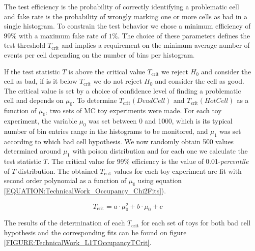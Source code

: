 The test efficiency is the probability of correctly identifying a problematic cell and fake rate is the probability of wrongly marking one or more cells as bad in a single histogram. To constrain the test behavior we chose a minimum efficiency of $99\%$ with a maximum fake rate of $1\%$. The choice of these parameters defines the test threshold $T_{\text{crit}}$ and implies a requirement on the minimum average number of events per cell depending on the number of bins per histogram.

If the test statistic $T$ is above the critical value $T_{\text{crit}}$ we reject $H_0$ and consider the cell as bad, if is it below $T_{\text{crit}}$ we do not reject $H_0$ and consider the cell as good. The critical value is set by a choice of confidence level of finding a problematic cell and depends on $\mu_0$. To determine $T_{\text{crit}}(Dead Cell)$ and $T_{\text{crit}}(Hot Cell)$ as a function of $\mu_0$, two sets of \gls{MC} toy experiments were made. For each toy experiment, the variable $\mu_0$ was set between 0 and 1000, which is its typical number of bin entries range in the histograms to be monitored, and $\mu_1$ was set according to which bad cell hypothesis. We now randomly obtain 500 values determined around $\mu_1$ with poison distribution and for each one we calculate the test statistic $T$. The critical value for 99\% efficiency is the value of 0.01-\textit{percentile} of $T$ distribution. The obtained $T_{\text{crit}}$ values for each toy experiment are fit with second order polynomial as a function of $\mu_0$ using equation \ref{EQUATION:TechnicalWork_Occupancy_Chi2Fits}).


\begin{equation}
T_{\text{crit}}=a \cdot \mu_0^2 + b \cdot \mu_0 + c
\label{EQUATION:TechnicalWork_Occupancy_Chi2Fits}
\end{equation}

The results of the determination of each $T_{\text{crit}}$ for each set of toys for both bad cell hypothesis and the corresponding fits can be found on figure \ref{FIGURE:TechnicalWork_L1TOccupancyTCrit}.

